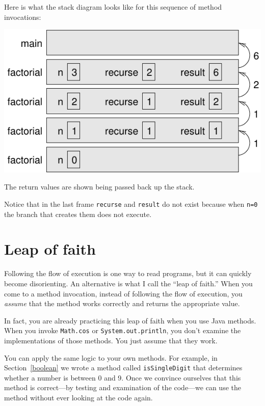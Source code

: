 \documentclass[12pt]{book}
\begin{document}

Here is what the stack diagram looks like for this sequence of method invocations:

\includegraphics{figs/stack3.pdf}

The return values are shown being passed back up the stack.

Notice that in the last frame {\tt recurse} and {\tt result} do not exist because when {\tt n=0} the branch that creates them does not execute.


\section{Leap of faith}
\label{leap of faith}


Following the flow of execution is one way to read programs, but it can quickly become disorienting.
An alternative is what I call the ``leap of faith.''
When you come to a method invocation, instead of following the flow of execution, you {\em assume} that the method works correctly and returns the appropriate value.

In fact, you are already practicing this leap of faith when you use Java methods.
When you invoke {\tt Math.cos} or {\tt System.out.println}, you don't examine the implementations of those methods.
You just assume that they work.

You can apply the same logic to your own methods.
For example, in Section~\ref{boolean} we wrote a method called {\tt isSingleDigit} that determines whether a number is between 0 and 9.
Once we convince ourselves that this method is correct---by testing and examination of the code---we can use the method without ever looking at the code again.
\end{document}

